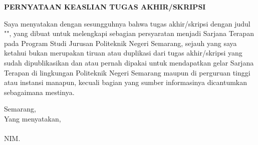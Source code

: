 \begin{center}
    \textbf{PERNYATAAN KEASLIAN TUGAS AKHIR/SKRIPSI}
\end{center}
\vspace{1cm}

\noindent Saya menyatakan dengan sesungguhnya bahwa tugas akhir/skripsi dengan judul "{\judulid}", yang dibuat untuk melengkapi sebagian persyaratan menjadi Sarjana Terapan pada Program Studi {\prodii} Jurusan {\jurusan} Politeknik Negeri Semarang, sejauh yang saya ketahui bukan merupakan tiruan atau duplikasi dari tugas akhir/skripsi yang sudah dipublikasikan dan atau pernah dipakai untuk mendapatkan gelar Sarjana Terapan di lingkungan Politeknik Negeri Semarang maupun di perguruan tinggi atau instansi manapun, kecuali bagian yang sumber informasinya dicantumkan sebagaimana mestinya.

\vspace{2cm}
\begin{flushright}
    Semarang, \tglpernyataan\\
    Yang menyatakan,\\[1.75cm]
    \penulis \\
    NIM. \nim\\[1cm]
\end{flushright}
